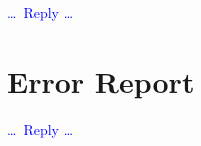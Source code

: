 \documentclass[a4paper,11pt,hidelinks]{article}
\renewcommand{\todo}[1]{\textcolor{blue}{#1}} %
\begin{document}

\todo{\dots\ Reply \dots}



\section*{Error Report}


\todo{\dots\ Reply \dots}



% 
% 
\end{document}
